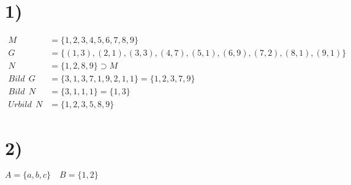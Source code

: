 \documentclass{alex_hü}
\begin{document}
\renewcommand{\labelenumi}{\roman{enumi})}
	
	
	\section*{1)}
	
	\begin{align*}
		M &= \{1,2,3,4,5,6,7,8,9\} \\
		G &= \{(1,3),(2,1),(3,3),(4,7),(5,1),(6,9),(7,2),(8,1),(9,1)\} \\
		N &= \{1,2,8,9\} \supset M \\[4ex]
		Bild\ \ G &=\{3,1,3,7,1,9,2,1,1\} = \{1,2,3,7,9\}\\
		Bild\ \ N &= \{3,1,1,1\} = \{1,3\}\\
		Urbild\ \ N &= \{1,2,3,5,8,9\}
	\end{align*}

	
	\section*{2)} 
	$A = \{a,b,c\}\quad B = \{1,2\}$
	
\end{document}
